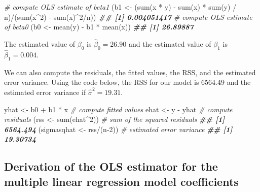 \documentclass[
]{book}
\newenvironment{Shaded}{\begin{snugshade}}{\end{snugshade}}
\newcommand{\CommentTok}[1]{\textcolor[rgb]{0.56,0.35,0.01}{\textit{#1}}}
\newcommand{\DecValTok}[1]{\textcolor[rgb]{0.00,0.00,0.81}{#1}}
\newcommand{\DocumentationTok}[1]{\textcolor[rgb]{0.56,0.35,0.01}{\textbf{\textit{#1}}}}
\newcommand{\FunctionTok}[1]{\textcolor[rgb]{0.00,0.00,0.00}{#1}}
\newcommand{\NormalTok}[1]{#1}
\newcommand{\OtherTok}[1]{\textcolor[rgb]{0.56,0.35,0.01}{#1}}
\newcommand{\SpecialCharTok}[1]{\textcolor[rgb]{0.00,0.00,0.00}{#1}}
\theoremstyle{definition}
\theoremstyle{definition}
\theoremstyle{definition}
\theoremstyle{definition}
\theoremstyle{remark}
\begin{document}
\begin{Shaded}
\begin{Highlighting}[]
\CommentTok{\# compute OLS estimate of beta1}
\NormalTok{(b1 }\OtherTok{\textless{}{-}}\NormalTok{ (}\FunctionTok{sum}\NormalTok{(x }\SpecialCharTok{*}\NormalTok{ y) }\SpecialCharTok{{-}} \FunctionTok{sum}\NormalTok{(x) }\SpecialCharTok{*} \FunctionTok{sum}\NormalTok{(y) }\SpecialCharTok{/}\NormalTok{ n)}\SpecialCharTok{/}\NormalTok{(}\FunctionTok{sum}\NormalTok{(x}\SpecialCharTok{\^{}}\DecValTok{2}\NormalTok{) }\SpecialCharTok{{-}} \FunctionTok{sum}\NormalTok{(x)}\SpecialCharTok{\^{}}\DecValTok{2}\SpecialCharTok{/}\NormalTok{n))}
\DocumentationTok{\#\# [1] 0.004051417}
\CommentTok{\# compute OLS estimate of beta0}
\NormalTok{(b0 }\OtherTok{\textless{}{-}} \FunctionTok{mean}\NormalTok{(y) }\SpecialCharTok{{-}}\NormalTok{ b1 }\SpecialCharTok{*} \FunctionTok{mean}\NormalTok{(x))}
\DocumentationTok{\#\# [1] 26.89887}
\end{Highlighting}
\end{Shaded}

The estimated value of \(\beta_0\) is \(\hat{\beta}_0=26.90\) and the estimated value of \(\beta_1\) is \(\hat{\beta}_1=0.004\).

We can also compute the residuals, the fitted values, the RSS, and the estimated error variance. Using the code below, the RSS for our model is 6564.49 and the estimated error variance if \(\hat{\sigma}^2=19.31\).

\begin{Shaded}
\begin{Highlighting}[]
\NormalTok{yhat }\OtherTok{\textless{}{-}}\NormalTok{ b0 }\SpecialCharTok{+}\NormalTok{ b1 }\SpecialCharTok{*}\NormalTok{ x }\CommentTok{\# compute fitted values}
\NormalTok{ehat }\OtherTok{\textless{}{-}}\NormalTok{ y }\SpecialCharTok{{-}}\NormalTok{ yhat }\CommentTok{\# compute residuals}
\NormalTok{(rss }\OtherTok{\textless{}{-}} \FunctionTok{sum}\NormalTok{(ehat}\SpecialCharTok{\^{}}\DecValTok{2}\NormalTok{)) }\CommentTok{\# sum of the squared residuals}
\DocumentationTok{\#\# [1] 6564.494}
\NormalTok{(sigmasqhat }\OtherTok{\textless{}{-}}\NormalTok{ rss}\SpecialCharTok{/}\NormalTok{(n}\DecValTok{{-}2}\NormalTok{)) }\CommentTok{\# estimated error variance}
\DocumentationTok{\#\# [1] 19.30734}
\end{Highlighting}
\end{Shaded}

\hypertarget{mlr-derivation}{%
\subsection{Derivation of the OLS estimator for the multiple linear regression model coefficients}\label{mlr-derivation}}
\end{document}
